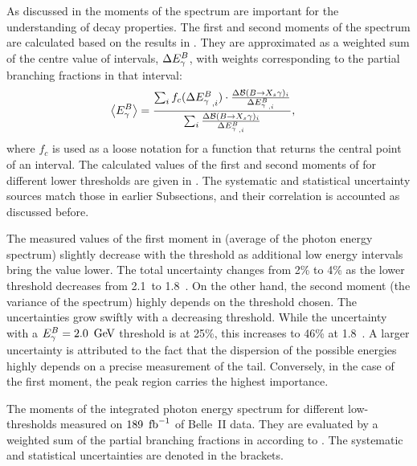 As discussed in  the moments of the \BtoXsgamma
spectrum are important for the understanding of \BtoXsgamma decay properties.
The first and second moments of the \BtoXsgamma spectrum are calculated based on the results in .
They are approximated as a weighted sum of the centre value of \EB intervals, $\Delta{\ensuremath{E^B_{\gamma}}}$,
with weights corresponding to the partial branching fractions in that \EB interval:
\begin{align}\label{eq:weighted_sum_moments}
    \begin{split}
        \expval{\EB} &= \frac{\sum_i f_c(\Delta\EB^{}_{,i})\cdot  
                               \frac{\Delta\mathcal{B}(\BtoXsgamma)_i}
                                    {\Delta {E^B_{\g}}_{,i}}}
                             {\sum_i \frac{\Delta\mathcal{B}(\BtoXsgamma)_i}{\Delta {E^B_{\g}}_{,i}}},
    \end{split}
\end{align} 
where $f_c$ is used as a loose notation for a function that returns the central point of an interval.
The calculated values of the first and second moments of \EB for different lower thresholds are given in .
The systematic and statistical uncertainty sources match those in earlier Subsections, and their correlation is accounted as discussed before.

The measured values of the first moment in  (average of the photon energy spectrum) slightly decrease with the \EB threshold as additional
low energy \EB intervals bring the value lower.
The total uncertainty changes from 2\% to 4\% as the \EB lower threshold decreases from 2.1~\gev to 1.8~\gev.
On the other hand, the second moment (the variance of the spectrum) highly depends on the threshold chosen.
The uncertainties grow swiftly with a decreasing \EB threshold.
While the uncertainty with a ${E^B_{\gamma}}=2.0~\mathrm{\,Ge\kern -0.1em V}$ threshold is at 25\%, this increases to 46\% at 1.8~\gev.
A larger uncertainty is attributed to the fact that the dispersion of the possible \EB energies highly depends on a precise measurement of the tail.
Conversely, in the case of the first moment, the peak region carries the highest importance.


\begin{table}[htbp!]
    \centering
    \caption{\label{tab:moments}
    The moments of the integrated \BtoXsgamma photon energy spectrum for different low-\EB thresholds measured on $189~\mbox{\,fb}^{-1}$ of Belle~II data.
    They are evaluated by a weighted sum of the partial branching fractions in  according to .
    The systematic and statistical uncertainties are denoted in the brackets.
    }
    
\end{table}
